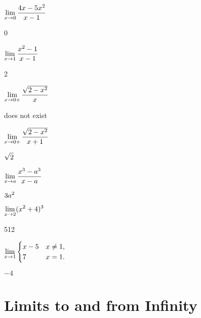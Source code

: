 \begin{exercises}
\begin{exercise} $\displaystyle \lim _{x\to 0 } {4x - 5x^2\over x-1}$
\begin{answer} 0
\end{answer}\end{exercise}

\begin{exercise} $\displaystyle\lim _{x\to 1 } {x^2 -1 \over x-1 }$
\begin{answer} 2
\end{answer}\end{exercise}

\begin{exercise} $\displaystyle\lim _{x\to 0 + } {\sqrt{2-x^2 }\over x}$
\begin{answer} does not exist
\end{answer}\end{exercise}

\begin{exercise} $\displaystyle\lim _{x\to 0 + } {\sqrt{2-x^2}\over x+1}$
\begin{answer} $\displaystyle \sqrt2$
\end{answer}\end{exercise}

\begin{exercise} $\displaystyle\lim _{x\to a } {x^3 -a^3\over x-a}$
\begin{answer} $\displaystyle 3a^2$
\end{answer}\end{exercise}

\begin{exercise} $\displaystyle\lim _{x\to 2 } (x^2 +4)^3$
\begin{answer} 512
\end{answer}\end{exercise}

\begin{exercise} $\displaystyle\lim _{x\to 1 } \begin{cases}
x-5 & x\neq 1, \\
7 & x=1. \end{cases}$
\begin{answer} $-4$
\end{answer}\end{exercise}

\endtwocol

\end{exercises}


\section{Limits to and from Infinity}


